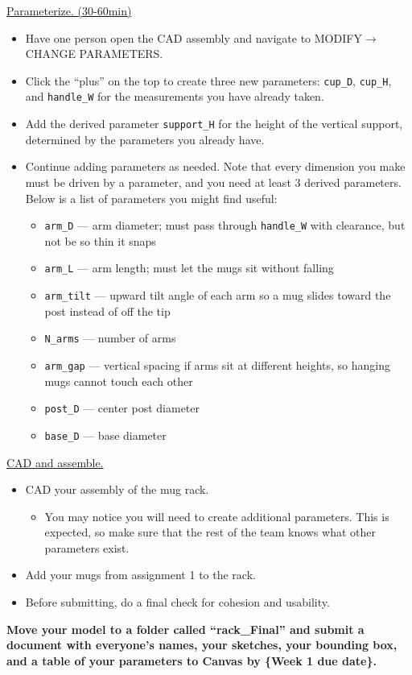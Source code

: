 \documentclass[11pt,letterpaper]{article}
\begin{document}
\begin{AssignmentSteps}[start=3]
  \item \underline{Parameterize. (30-60min)}
\end{AssignmentSteps}
\begin{itemize}
  \item Have one person open the CAD assembly and navigate to MODIFY\(\rightarrow\)CHANGE PARAMETERS.
  \item Click the ``plus'' on the top to create three new parameters: \texttt{cup\_D}, \texttt{cup\_H}, and \texttt{handle\_W} for the measurements you have already taken.
  \item Add the derived parameter \texttt{support\_H} for the height of the vertical support, determined by the parameters you already have.
  \item Continue adding parameters as needed. Note that every dimension you make must be driven by a parameter, and you need at least 3 derived parameters. Below is a list of parameters you might find useful:
  \begin{itemize}
    \item \texttt{arm\_D} --- arm diameter; must pass through \texttt{handle\_W} with clearance, but not be so thin it snaps
    \item \texttt{arm\_L} --- arm length; must let the mugs sit without falling
    \item \texttt{arm\_tilt} --- upward tilt angle of each arm so a mug slides toward the post instead of off the tip
    \item \texttt{N\_arms} --- number of arms
    \item \texttt{arm\_gap} --- vertical spacing if arms sit at different heights, so hanging mugs cannot touch each other
    \item \texttt{post\_D} --- center post diameter
    \item \texttt{base\_D} --- base diameter
  \end{itemize}
\end{itemize}
\begin{AssignmentSteps}[start=4]
  \item \underline{CAD and assemble.}
\end{AssignmentSteps}
\begin{itemize}
  \item CAD your assembly of the mug rack.
  \begin{itemize}
    \item You may notice you will need to create additional parameters. This is expected, so make sure that the rest of the team knows what other parameters exist.
  \end{itemize}
  \item Add your mugs from assignment 1 to the rack.
  \item Before submitting, do a final check for cohesion and usability.
\end{itemize}
\textbf{Move your model to a folder called ``rack\_Final'' and submit a document with everyone's names, your sketches, your bounding box, and a table of your parameters to Canvas by \{Week 1 due date\}.}
\end{document}
